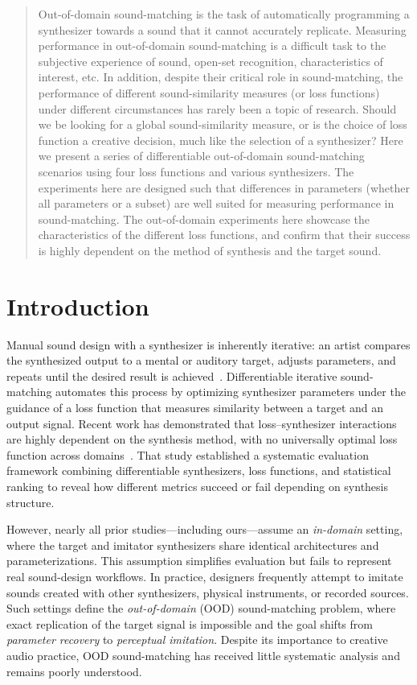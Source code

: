 \documentclass[14pt]{extarticle} %
\begin{document}
\begin{abstract}
 Out-of-domain sound-matching is the task of automatically programming a synthesizer towards a sound that it cannot accurately replicate. Measuring performance in out-of-domain sound-matching is a difficult task to the subjective experience of sound, open-set recognition, characteristics of interest, etc. In addition, despite their critical role in sound-matching, the performance of different sound-similarity measures (or loss functions) under different circumstances has rarely been a topic of research. Should we be looking for a global sound-similarity measure, or is the choice of loss function a creative decision, much like the selection of a synthesizer?
 Here we present a series of differentiable out-of-domain sound-matching scenarios using four loss functions and various synthesizers. The experiments here are designed such that differences in parameters (whether all parameters or a subset) are well suited for measuring performance in sound-matching. The out-of-domain experiments here showcase the characteristics of the different loss functions, and confirm that their success is highly dependent on the method of synthesis and the target sound. 
\end{abstract}

\section{Introduction}
\label{sec:intro}
Manual sound design with a synthesizer is inherently iterative: an artist compares the synthesized output to a mental or auditory target, adjusts parameters, and repeats until the desired result is achieved~\cite{salimi2025soundmatching}.  
Differentiable iterative sound-matching automates this process by optimizing synthesizer parameters under the guidance of a loss function that measures similarity between a target and an output signal.  
Recent work has demonstrated that loss–synthesizer interactions are highly dependent on the synthesis method, with no universally optimal loss function across domains~\cite{salimi2025soundmatching}.  
That study established a systematic evaluation framework combining differentiable synthesizers, loss functions, and statistical ranking to reveal how different metrics succeed or fail depending on synthesis structure.

However, nearly all prior studies—including ours—assume an \emph{in-domain} setting, where the target and imitator synthesizers share identical architectures and parameterizations.  
This assumption simplifies evaluation but fails to represent real sound-design workflows.  
In practice, designers frequently attempt to imitate sounds created with other synthesizers, physical instruments, or recorded sources.  
Such settings define the \emph{out-of-domain} (OOD) sound-matching problem, where exact replication of the target signal is impossible and the goal shifts from \emph{parameter recovery} to \emph{perceptual imitation}.  
Despite its importance to creative audio practice, OOD sound-matching has received little systematic analysis and remains poorly understood.
\end{document}
